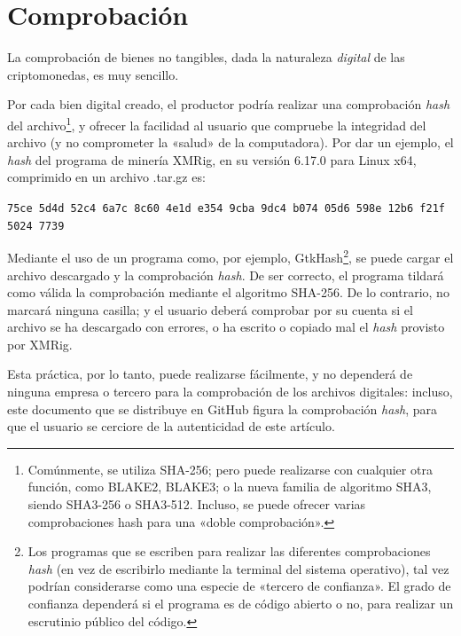 \documentclass[12pt,a4paper]{article}
\begin{document}
\section{Comprobación}
La comprobación de bienes no tangibles, dada la naturaleza \textit{digital} de las criptomonedas, es muy sencillo.

Por cada bien digital creado, el productor podría realizar una comprobación \textit{hash} del archivo\footnote{Comúnmente, se utiliza SHA-256; pero puede realizarse con cualquier otra función, como BLAKE2, BLAKE3; o la nueva familia de algoritmo SHA3, siendo SHA3-256 o SHA3-512. Incluso, se puede ofrecer varias comprobaciones hash para una «doble comprobación».}, y ofrecer la facilidad al usuario que compruebe la integridad del archivo (y no comprometer la «salud» de la computadora). Por dar un ejemplo, el \textit{hash} del programa de minería XMRig, en su versión 6.17.0 para Linux x64, comprimido en un archivo .tar.gz es:

\begin{center}
\texttt{75ce 5d4d 52c4 6a7c 8c60 4e1d e354 9cba 9dc4 b074 05d6 598e 12b6 f21f 5024 7739}
\end{center}

Mediante el uso de un programa como, por ejemplo, GtkHash\footnote{Los programas que se escriben para realizar las diferentes comprobaciones \textit{hash} (en vez de escribirlo mediante la terminal del sistema operativo), tal vez podrían considerarse como una especie de «tercero de confianza». El grado de confianza dependerá si el programa es de código abierto o no, para realizar un escrutinio público del código.}, se puede cargar el archivo descargado y la comprobación \textit{hash}. De ser correcto, el programa tildará como válida la comprobación mediante el algoritmo SHA-256. De lo contrario, no marcará ninguna casilla; y el usuario deberá comprobar por su cuenta si el archivo se ha descargado con errores, o ha escrito o copiado mal el \textit{hash} provisto por XMRig.

Esta práctica, por lo tanto, puede realizarse fácilmente, y no dependerá de ninguna empresa o tercero para la comprobación de los archivos digitales: incluso, este documento que se distribuye en GitHub figura la comprobación \textit{hash}, para que el usuario se cerciore de la autenticidad de este artículo.
\end{document}
